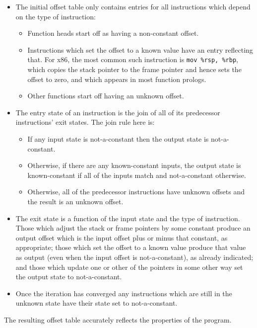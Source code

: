 \begin{itemize}
\item
  The initial offset table only contains entries for all instructions
  which depend on the type of instruction:

  \begin{itemize}
  \item Function heads start off as having a non-constant offset.
  \item Instructions which set the offset to a known value have an
    entry reflecting that.  For x86, the most common such instruction
    is \verb|mov %rsp, %rbp|, which copies the stack pointer to the
    frame pointer and hence sets the offset to zero, and which appears in
    most function prologs.
  \item Other functions start off having an unknown offset.
  \end{itemize}
\item
  The entry state of an instruction is the join of all of its
  predecessor instructions' exit states.  The join rule here
  is:

  \begin{itemize}
  \item
    If any input state is not-a-constant then the output state is
    not-a-constant.
  \item
    Otherwise, if there are any known-constant inputs, the output
    state is known-constant if all of the inputs match and
    not-a-constant otherwise.
  \item
    Otherwise, all of the predecessor instructions have unknown
    offsets and the result is an unknown offset.
  \end{itemize}
\item
  The exit state is a function of the input state and the type of
  instruction.  Those which adjust the stack or frame pointers by some
  constant produce an output offset which is the input offset plus or
  minus that constant, as appropriate; those which set the offset to a
  known value produce that value as output (even when the input offset
  is not-a-constant), as already indicated; and those which update one
  or other of the pointers in some other way set the output state to
  not-a-constant.
\item
  Once the iteration has converged any instructions which are still in
  the unknown state have their state set to not-a-constant.
\end{itemize}

The resulting offset table accurately reflects the properties of the
program.



